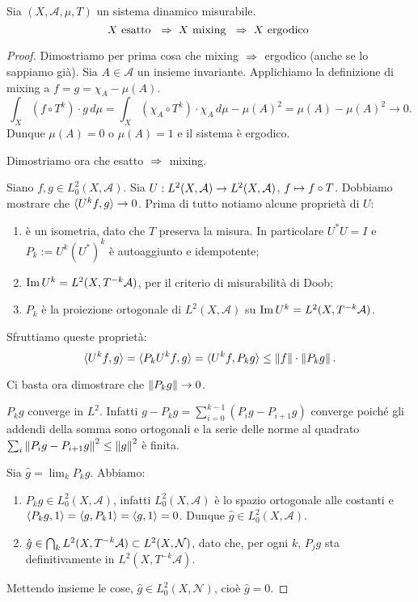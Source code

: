 \begin{prop} Sia $(X,\mathcal{A},\mu,T)$ un sistema dinamico misurabile. 
$$X \text{ esatto } \;\Rightarrow \; X \text{ mixing } \;\Rightarrow \; X \text{ ergodico }$$\end{prop}
\begin{proof} Dimostriamo per prima cosa che mixing $\;\Rightarrow \;$ ergodico (anche se lo sappiamo già). Sia $A\in\mathcal{A}$ un insieme invariante. Applichiamo la definizione di mixing a $f=g=\chi_A-\mu(A)$.
$$\int_X \left(f\circ T^k \right) \cdot g \, d\mu=\int_X \left(\chi_A\circ T^k \right) \cdot \chi_A \, d\mu-\mu(A)^2=\mu(A)-\mu(A)^2\rightarrow 0.$$
Dunque $\mu(A)=0$ o $\mu(A)=1$ e il sistema \`e ergodico.

Dimostriamo ora che esatto $\;\Rightarrow \;$ mixing.

Siano $f,g\in L^2_0(X,\mathcal{A})$. Sia $U:L^2(X,\mathcal{A})\stackrel{}{\rightarrow} L^2(X,\mathcal{A})$, $f\stackrel{}{\mapsto} f\circ T$. Dobbiamo mostrare che $\langle U^k f, g \rangle\rightarrow 0$.
Prima di tutto notiamo alcune propriet\`a di $U$:
\begin{enumerate}
\item \`e un isometria, dato che $T$ preserva la misura. In particolare $U^*U=I$ e $P_k:=U^k(U^*)^k$ \`e autoaggiunto e idempotente;
\item $\mathrm{Im} \, U^k=L^2(X,T^{-k}\mathcal{A})$, per il criterio di misurabilit\`a di Doob;
\item $P_k$ \`e la proiezione ortogonale di $L^2(X,\mathcal{A})$ su $\mathrm{Im} \, U^k=L^2(X,T^{-k}\mathcal{A})$.
\end{enumerate}

Sfruttiamo queste propriet\`a:
$$\langle U^k f, g \rangle=\langle P_k U^k f, g \rangle=\langle U^k f, P_k g \rangle\leq \left\| f \right\| \cdot\left\| P_k g \right\|.$$

Ci basta ora dimostrare che $\left\| P_k g \right\|\rightarrow 0$. 

$P_k g$ converge in $L^2$. Infatti $g-P_k g=\sum_{i=0}^{k-1} (P_i g - P_{i+1} g)$  converge poich\'e gli addendi della somma sono ortogonali e la serie delle norme al quadrato $\sum_i \left\| P_i g - P_{i+1} g \right\|^2\leq\left\| g \right\|^2$ \`e finita. 

Sia $\hat{g}=\lim_k P_k g$. Abbiamo:\begin{enumerate}
\item $P_k g\in L^2_0(X,\mathcal{A})$, infatti $L^2_0(X,\mathcal{A})$ \`e lo spazio ortogonale alle costanti e $\langle P_k g, 1 \rangle=\langle g, P_k 1 \rangle=\langle g, 1 \rangle=0$. Dunque $\hat{g}\in L^2_0(X,\mathcal{A})$. 
\item $\hat{g}\in \bigcap_k L^2(X,T^{-k}\mathcal{A})\subset L^2(X,\mathcal{N})$, dato che, per ogni $k$,  $P_j g$ sta definitivamente in $L^2(X,T^{-k}\mathcal{A})$.
\end{enumerate}
Mettendo insieme le cose, $\hat{g}\in L^2_0(X,\mathcal{N})$, cio\`e $\hat{g}=0$.
\end{proof}



